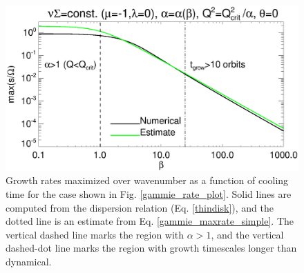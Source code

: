 
\begin{figure}
  \includegraphics[width=\linewidth,clip=true,trim=0cm 0cm 0.cm
    0.0cm]{figures/result2d_gvisc}
  \caption{Growth rates maximized over wavenumber as a function of cooling time for the
    case shown in Fig. \ref{gammie_rate_plot}. Solid lines are
    computed from the dispersion relation (Eq. \ref{thindisk}), and the dotted line is an
    estimate from Eq. \ref{gammie_maxrate_simple}. The vertical dashed
    line marks the region with $\alpha > 1$, and the vertical
    dashed-dot line marks the region with growth timescales longer
    than dynamical. 
    \label{gammie_maxrate_plot}}
\end{figure}
